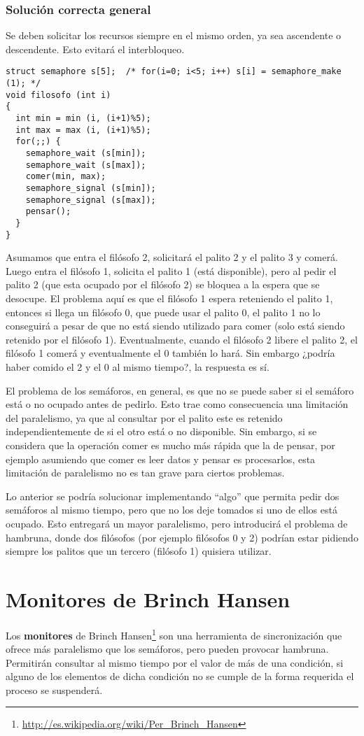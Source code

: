 \subsubsection{Solución correcta general}
Se deben solicitar los recursos siempre en el mismo orden, ya sea ascendente o
descendente. Esto evitará el interbloqueo.

\begin{lstlisting}
struct semaphore s[5];  /* for(i=0; i<5; i++) s[i] = semaphore_make (1); */
void filosofo (int i)
{
  int min = min (i, (i+1)%5);
  int max = max (i, (i+1)%5);
  for(;;) {
    semaphore_wait (s[min]);
    semaphore_wait (s[max]);
    comer(min, max);
    semaphore_signal (s[min]);
    semaphore_signal (s[max]);
    pensar();
  }
}
\end{lstlisting}

Asumamos que entra el filósofo 2, solicitará el palito 2 y el palito 3 y comerá.
Luego entra el filósofo 1, solicita el palito 1 (está disponible), pero al pedir
el palito 2 (que esta ocupado por el filósofo 2) se bloquea a la espera que se
desocupe. El problema aquí es que el filósofo 1 espera reteniendo el palito 1,
entonces si llega un filósofo 0, que puede usar el palito 0, el palito 1 no lo
conseguirá a pesar de que no está siendo utilizado para comer (solo está siendo
retenido por el filósofo 1). Eventualmente, cuando el filósofo 2 libere el
palito 2, el filósofo 1 comerá y eventualmente el 0 también lo hará. Sin embargo
¿podría haber comido el 2 y el 0 al mismo tiempo?, la respuesta es sí.

El problema de los semáforos, en general, es que no se puede saber si el
semáforo está o no ocupado antes de pedirlo. Esto trae como consecuencia una
limitación del paralelismo, ya que al consultar por el palito este es retenido
independientemente de si el otro está o no disponible. Sin embargo, si se
considera que la operación comer es mucho más rápida que la de pensar, por
ejemplo asumiendo que comer es leer datos y pensar es procesarlos, esta
limitación de paralelismo no es tan grave para ciertos problemas.

Lo anterior se podría solucionar implementando ``algo'' que permita pedir dos
semáforos al mismo tiempo, pero que no los deje tomados si uno de ellos está
ocupado. Esto entregará un mayor paralelismo, pero introducirá el problema de
hambruna, donde dos filósofos (por ejemplo filósofos 0 y 2) podrían estar
pidiendo siempre los palitos que un tercero (filósofo 1) quisiera utilizar.

\section{Monitores de Brinch Hansen}
Los \textbf{monitores} de Brinch
Hansen\footnote{\url{http://es.wikipedia.org/wiki/Per_Brinch_Hansen}} son una
herramienta de sincronización que ofrece más paralelismo que los semáforos, pero
pueden provocar hambruna. Permitirán consultar al mismo tiempo por el valor de
más de una condición, si alguno de los elementos de dicha condición no se cumple
de la forma requerida el proceso se suspenderá.

